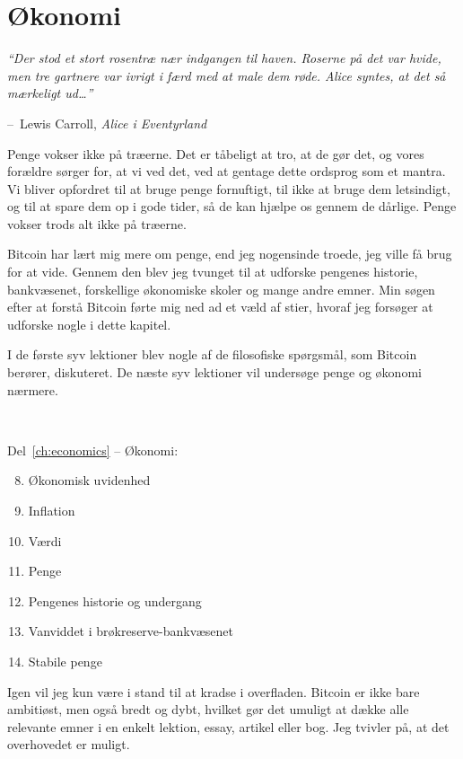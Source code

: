 \documentclass[paper=6in:9in,pagesize=pdftex,headinclude=on,footinclude=on,12pt]{scrbook}
\makeatletter
\newenvironment{chapquote}[2][4em]{\setlength{\@tempdima}{#1}%
   \def\chapquote@author{#2}%
   \parshape 1 \@tempdima \dimexpr\textwidth-2\@tempdima\relax%
   \itshape}{\par\normalfont\hfill--\ \chapquote@author\hspace*{\@tempdima}\par\bigskip}
\makeatother
\begin{document}
\chapter*{Økonomi}

\begin{chapquote}{Lewis Carroll, \textit{Alice i Eventyrland}}
\enquote{Der stod et stort rosentræ nær indgangen til haven. Roserne på det var hvide, men tre gartnere var ivrigt i færd med at male dem røde. Alice syntes, at det så mærkeligt ud\ldots}
\end{chapquote}

Penge vokser ikke på træerne. Det er tåbeligt at tro, at de gør det, og vores forældre sørger for, at vi ved det, ved at gentage dette ordsprog som et mantra. Vi bliver opfordret til at bruge penge fornuftigt, til ikke at bruge dem letsindigt, og til at spare dem op i gode tider, så de kan hjælpe os gennem de dårlige. Penge vokser trods alt ikke på træerne.

Bitcoin har lært mig mere om penge, end jeg nogensinde troede, jeg ville få brug for at vide. Gennem den blev jeg tvunget til at udforske pengenes historie, bankvæsenet, forskellige økonomiske skoler og mange andre emner. Min søgen efter at forstå Bitcoin førte mig ned ad et væld af stier, hvoraf jeg forsøger at udforske nogle i dette kapitel.

I de første syv lektioner blev nogle af de filosofiske spørgsmål, som Bitcoin berører, diskuteret. De næste syv lektioner vil undersøge penge og økonomi nærmere.

~\begin{samepage} Del~\ref{ch:economics} -- Økonomi:\begin{enumerate}
  \setcounter{enumi}{7}
  \item Økonomisk uvidenhed \item Inflation \item Værdi \item Penge \item Pengenes historie og undergang \item Vanviddet i brøkreserve-bankvæsenet \item Stabile penge \end{enumerate}
\end{samepage}

Igen vil jeg kun være i stand til at kradse i overfladen. Bitcoin er ikke bare ambitiøst, men også bredt og dybt, hvilket gør det umuligt at dække alle relevante emner i en enkelt lektion, essay, artikel eller bog. Jeg tvivler på, at det overhovedet er muligt.
\end{document}
